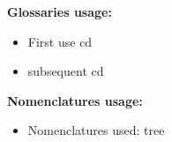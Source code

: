 \documentclass{article}
\begin{document}
\noindent
{\bf Glossaries usage:}
\begin{itemize}
    \item First use \gls{cd}
    \item subsequent \gls{cd}
\end{itemize}

\noindent
{\bf Nomenclatures usage:}
\begin{itemize}
    \item Nomenclatures used: \gls{tree}
\end{itemize}


\printglossaries
\end{document}
